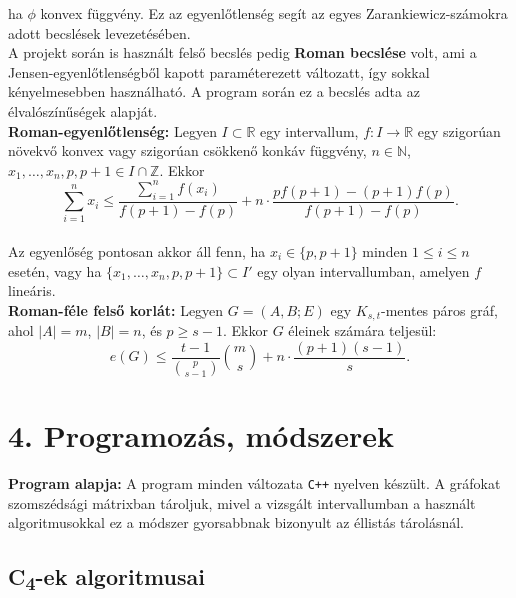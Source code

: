 \documentclass[12pt,a4paper]{article}
\begin{document}
ha $\phi$ konvex függvény. Ez az egyenlőtlenség segít az egyes Zarankiewicz-számokra adott becslések levezetésében.
\\[2mm]
A projekt során is használt felső becslés pedig \textbf{Roman becslése} volt, ami a Jensen-egyenlőtlenségből kapott paraméterezett változatt, így sokkal kényelmesebben használható. A program során ez a becslés adta az élvalószínűségek alapját.
\\[2mm]
\textbf{Roman-egyenlőtlenség:} Legyen $I \subset \mathbb{R}$ egy intervallum, $f : I \to \mathbb{R}$ egy szigorúan növekvő konvex vagy szigorúan csökkenő konkáv függvény, $n \in \mathbb{N}$, $x_1, \dots, x_n, p, p+1 \in I \cap \mathbb{Z}$. Ekkor
\[
\sum_{i=1}^{n} x_i \leq \frac{\sum_{i=1}^{n} f(x_i)}{f(p+1) - f(p)} + n \cdot \frac{p f(p+1) - (p+1) f(p)}{f(p+1) - f(p)}.
\]
\\[2mm]
Az egyenlőség pontosan akkor áll fenn, ha $x_i \in \{p, p+1\}$ minden $1 \leq i \leq n$ esetén, vagy ha $\{x_1, \dots, x_n, p, p+1\} \subset I'$ egy olyan intervallumban, amelyen $f$ lineáris.
\\[2mm]
\textbf{Roman-féle felső korlát:} Legyen $G = (A, B; E)$ egy $K_{s,t}$-mentes páros gráf, ahol $|A| = m$, $|B| = n$, és $p \geq s - 1$. Ekkor $G$ éleinek számára teljesül:
\[
e(G) \leq \frac{t - 1}{\binom{p}{s - 1}} \binom{m}{s} + n \cdot \frac{(p + 1)(s - 1)}{s}.
\]

\section*{4. Programozás, módszerek}

\textbf{Program alapja:} A program minden változata \texttt{C++} nyelven készült. A gráfokat szomszédsági mátrixban tároljuk, mivel a vizsgált intervallumban a használt algoritmusokkal ez a módszer gyorsabbnak bizonyult az éllistás tárolásnál.


\subsection*{C\textsubscript{4}-ek algoritmusai}
\end{document}
